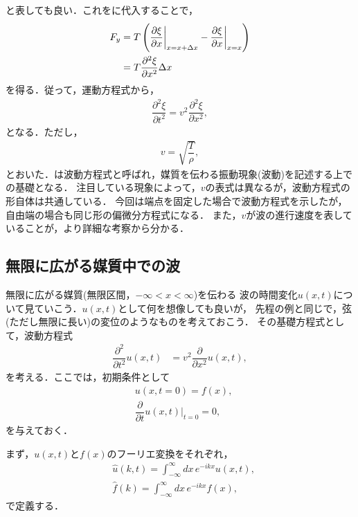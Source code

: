 と表しても良い．これをに代入することで，
\begin{align}
 F_y & =  T\left(\dfrac{\partial \xi }{\partial x}\biggr|_{x=x+\Delta x} - \dfrac{\partial \xi}{\partial x}\biggr|_{x=x}\right) \notag \\
     & = T\dfrac{\partial^2 \xi}{\partial x^2} \Delta x
\end{align}
を得る．従って，運動方程式から，
\begin{align}
  \dfrac{\partial^2 \xi}{\partial t^2} = v^{2} \dfrac{\partial^2 \xi}{\partial x^2}, \label{wave_eq} 
\end{align}
となる．ただし，
\begin{align}
  v = \sqrt{\dfrac{T}{\rho}},
\end{align}
とおいた．は波動方程式と呼ばれ，媒質を伝わる振動現象(波動)を記述する上での基礎となる．
注目している現象によって，$v$の表式は異なるが，波動方程式の形自体は共通している．
今回は端点を固定した場合で波動方程式を示したが，自由端の場合も同じ形の偏微分方程式になる．
また，$v$が波の進行速度を表していることが，より詳細な考察から分かる．
%
\subsection{無限に広がる媒質中での波}
%
無限に広がる媒質(無限区間，$-\infty < x < \infty$)を伝わる
波の時間変化$u(x,t)$について見ていこう．$u(x,t)$として何を想像しても良いが，
先程の例と同じで，弦(ただし無限に長い)の変位のようなものを考えておこう．
その基礎方程式として，波動方程式
\begin{align}
 \dfrac{\partial^{2}}{\partial t^{2}}u\left(x,t\right) & =v^{2}\dfrac{\partial}{\partial x^{2}}u\left(x,t\right),
\end{align}
を考える．ここでは，初期条件として
\begin{align}
  &u(x,t=0) = f(x), \\
  &\dfrac{\partial}{\partial t}u(x,t)\biggr|_{t=0} = 0,
\end{align}
を与えておく．

まず，$u(x,t)$と$f(x)$のフーリエ変換をそれぞれ，
\begin{align}
 & \hat{u}\left(k,t\right)=\int_{-\infty}^{\infty}dx\,e^{-ikx}u\left(x,t\right),\\
 & \hat{f}\left(k\right)=\int_{-\infty}^{\infty}dx\,e^{-ikx}f\left(x\right), 
\end{align}
で定義する．

